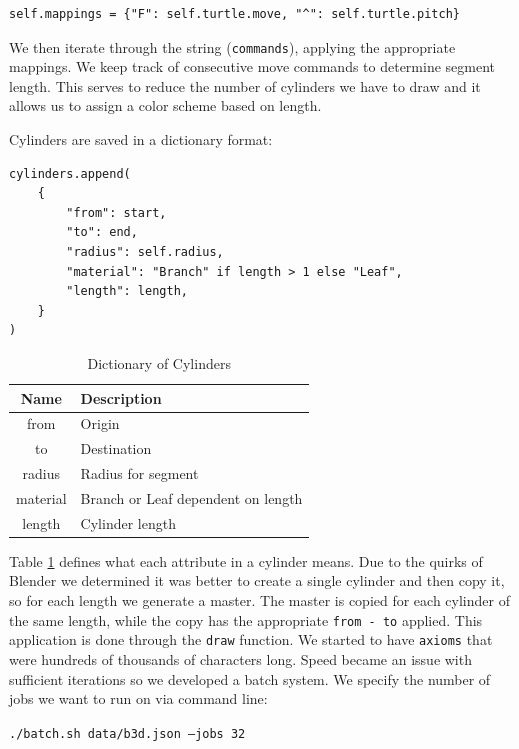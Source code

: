 \begin{verbatim}
self.mappings = {"F": self.turtle.move, "^": self.turtle.pitch}
\end{verbatim}

We then iterate through the string (\texttt{commands}), applying the 
appropriate mappings. We keep track of consecutive move commands to determine 
segment length. This serves to reduce the number of cylinders we have to draw 
and it allows us to assign a color scheme based on length.

Cylinders are saved in a dictionary format:
\begin{verbatim}
cylinders.append(
    {
        "from": start,
        "to": end,
        "radius": self.radius,
        "material": "Branch" if length > 1 else "Leaf",
        "length": length,
    }
)
\end{verbatim}

\begin{table}
\begin{center}
\begin{tabular}{| c | l |}
    \hline
    \textbf{Name} & \textbf{Description} \\ \hline
    from & Origin \\ \hline
    to & Destination \\ \hline
    radius & Radius for segment \\ \hline
    material & Branch or Leaf dependent on length \\ \hline
    length & Cylinder length  \\ \hline
\end{tabular}
\caption{Dictionary of Cylinders}
\label{table:dict_cylinders}
\end{center}
\end{table}

Table \ref{table:dict_cylinders} defines what each attribute in a cylinder 
means. Due to the quirks of Blender we determined it was better to create a 
single cylinder and then copy it, so for each length we generate a master. The 
master is copied for each cylinder of the same length, while the copy has the 
appropriate \texttt{from - to} applied. This application is done through the 
\texttt{draw} function. We started to have \texttt{axioms} that 
were hundreds of thousands of characters long. Speed became an issue with 
sufficient iterations so we developed a batch system.  We specify the number of 
jobs we want to run on via command line: 

\texttt{./batch.sh data/b3d.json --jobs 32}

